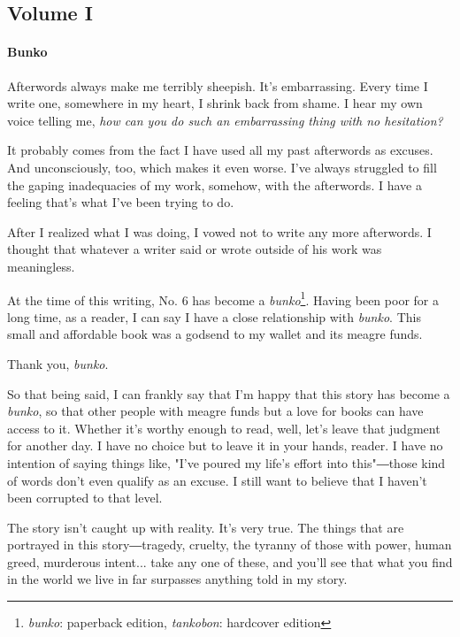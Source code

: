 
\subsection{Volume I}
\paragraph{Bunko}

Afterwords always make me terribly sheepish. It's embarrassing. Every
time I write one, somewhere in my heart, I shrink back from shame. I
hear my own voice telling me, \emph{how can you do such an embarrassing thing
with no hesitation?}

It probably comes from the fact I have used all my past afterwords as
excuses. And unconsciously, too, which makes it even worse. I've always
struggled to fill the gaping inadequacies of my work, somehow, with the
afterwords. I have a feeling that's what I've been trying to do.

After I realized what I was doing, I vowed not to write any more
afterwords. I thought that whatever a writer said or wrote outside of
his work was meaningless.

At the time of this writing, No. 6 has become a \emph{bunko}\footnote{\emph{bunko}: paperback edition, \emph{tankobon}: hardcover edition}.
Having been poor for a long time, as a reader, I can say I have a close
relationship with \emph{bunko}. This small and affordable book was a godsend to
my wallet and its meagre funds.

Thank you, \emph{bunko}.

So that being said, I can frankly say that I'm happy that this story has
become a \emph{bunko}, so that other people with meagre funds but a love for
books can have access to it. Whether it's worthy enough to read, well,
let's leave that judgment for another day. I have no choice but to leave
it in your hands, reader. I have no intention of saying things like,
"I've poured my life's effort into this"―those kind of words don't even
qualify as an excuse. I still want to believe that I haven't been
corrupted to that level.

The story isn't caught up with reality. It's very true. The things that
are portrayed in this story―tragedy, cruelty, the tyranny of those with
power, human greed, murderous intent... take any one of these, and
you'll see that what you find in the world we live in far surpasses
anything told in my story.


